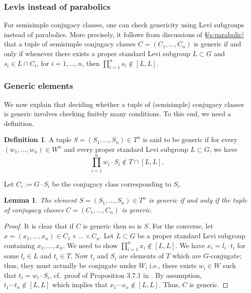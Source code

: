 \documentclass[12pt]{amsart}
\theoremstyle{plain}
\newtheorem{lem}[thm]{Lemma}
\theoremstyle{definition}
\newtheorem{defe}[thm]{Definition}
\theoremstyle{remark}
\begin{document}
\subsubsection{Levis instead of parabolics} For semisimple conjugacy classes, one can check genericity using  Levi subgroups instead of parabolics. More precisely,  it follows from discussions of \S \ref{s:parabolic} that a tuple of semisimple conjugacy classes  $C=(C_1,\ldots,C_n)$ is generic if and only if whenever there exists a proper standard Levi subgroup $L\subset G$ and $s_i\in L\cap C_i$,  for $i=1,\ldots,n$, then  $\prod_{i=1}^n s_i\notin [L,L]$. 




\subsubsection{Generic elements} 
We now explain that deciding whether a tuple of (semisimple) conjugacy classes is generic involves checking finitely many conditions. To this end, we need a definition. 

\begin{defe} A tuple $S=(S_1,\ldots,S_n)\in T^n$ is said to be generic if for every $(w_1,\ldots, w_n) \in W^n$ and every proper standard Levi subgroup $L\subset G$, we have 
\[
\prod_{i=1}^n w_i\cdot S_i \notin T\cap [L,L]. 
\] 
\end{defe} 

Let $C_i:=G\cdot  S_i$ be the conjugacy class corresponding to $S_i$. 

\begin{lem}  The element $S=(S_1,\ldots,S_n)\in T^n$ is generic if and only if the tuple of conjugacy classes $C=(C_1,\ldots,C_n)$ is generic. 
\end{lem} 



\begin{proof} 
It is clear that if $C$ is generic then so is $S$. For the converse, let $x=(x_1,\ldots,x_n) \in C_1\times\ldots \times C_n$. Let $L\subset G$ be a proper standard Levi subgroup containing $x_1,\ldots,x_n$. We need to show $\prod_{i=1}^n x_i\notin [L,L]$. We have $x_i=l_i \cdot  t_i$ for some $l_i\in L$ and $t_i\in T$. Now $t_i$ and $S_i$ are elements of $T$ which are $G$-conjugate; thus, they must actually be conjugate under $W$; i.e., there exists $w_i\in W$ such that $t_i=w_i \cdot  S_i$, cf.\ proof of Proposition 3.7.1 in \cite{Carter93}. By assumption, $t_1\cdots t_n\notin [L,L]$ which implies that $x_1\cdots x_n\notin [L,L]$. Thus, $C$ is generic.
\end{proof} 
\end{document}
